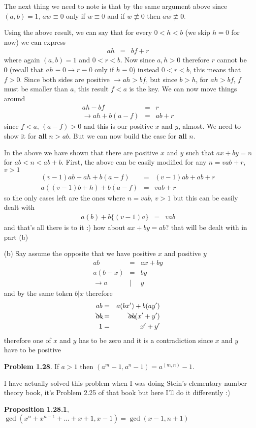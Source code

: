 \documentclass[aps,preprint,preprintnumbers,nofootinbib,showpacs,prd]{revtex4-1}
\newcommand{\nbea}{\begin{eqnarray*}}
\newcommand{\neea}{\end{eqnarray*}}
\begin{document}
The next thing we need to note is that by the same argument above since $(a,b)=1$, $aw \equiv 0$ only if $w \equiv 0$ and if $w \not \equiv 0$ then $aw \not\equiv 0$.

Using the above result, we can say that for every $0 < h < b$ (we skip $h=0$ for now) we can express
%
\nbea
ah & = & bf + r
\neea
%
where again $(a,b)=1$ and $0 < r < b$. Now since $a,h > 0$ therefore $r$ cannot be 0 (recall that $ah \equiv 0 \to r\equiv 0$ only if $h \equiv 0$) instead $0 < r < b$, this means that $f > 0$. Since both sides are positive $\to ah > bf$, but since $b > h$, for $ah > bf$, $f$ must be smaller than $a$, this result $f < a$ is the key. We can now move things around
%
\nbea
ah - bf & = & r \\
\to ah + b(a-f) & = & ab + r
\neea
%
since $f < a$, $(a-f) > 0$ and this is our positive $x$ and $y$, almost. We need to show it for {\bf all} $n > ab$. But we can now build the case for {\bf all} $n$.

In the above we have shown that there are positive $x$ and $y$ such that $ax + by = n$ for $ab < n < ab+b$. First, the above can be easily modified for any $n = vab + r$, $v > 1$
%
\nbea
(v-1)ab + ah + b(a-f) & = & (v-1)ab + ab + r \\
a((v-1)b + h) + b(a-f) & = & vab + r
\neea
%
so the only cases left are the ones where $n = vab$, $v > 1$ but this can be easily dealt with
%
\nbea
a(b) + b\{(v-1)a\}& = & vab
\neea
%
and that's all there is to it :) how about $ax + by = ab$? that will be dealt with in part (b)

(b) Say assume the opposite that we have positive $x$ and positive $y$
%
\nbea
ab & = & ax + by \\
a(b-x) & = & by \\
\to a &|& y
\neea
%
and by the same token $b|x$ therefore
%
\nbea
ab & = & a(bx') + b(ay') \\
\bcancel{ab} & = & \bcancel{ab}(x' + y') \\
1 & = & x' + y'
\neea
%
therefore one of $x$ and $y$ has to be zero and it is a contradiction since $x$ and $y$ have to be positive

{\bf Problem 1.28}. If $a>1$ then $(a^m-1,a^n-1)=a^{(m,n)}-1$.

I have actually solved this problem when I was doing Stein's elementary number theory book, it's Problem 2.25 of that book but here I'll do it differently :) 

{\bf Proposition 1.28.1}, $\gcd(x^n + x^{n-1} + \ldots + x + 1,x-1) = \gcd(x-1,n+1)$
\end{document}
